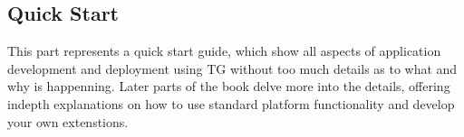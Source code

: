 \begin{partbacktext}
\part{Quick Start}  
  This part represents a quick start guide, which show all aspects of application development and deployment using TG without too much details as to what and why is happenning.
  Later parts of the book delve more into the details, offering indepth explanations on how to use standard platform functionality and develop your own extenstions.
\end{partbacktext}
